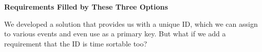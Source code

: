 \textbf{Requirements Filled by These Three Options}

\begin{table}[htbp]
\centering
\small
{}
\caption{Requirements Filled by These Three Options}
\end{table}

We developed a solution that provides us with a unique ID, which we can assign to various events and even use as a primary key. But what if we add a requirement that the ID is time sortable too?

